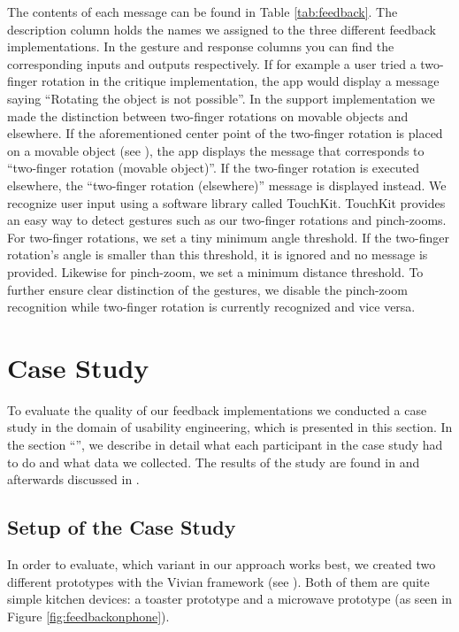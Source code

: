 \documentclass[11pt, a4paper]{article}
\begin{document}
		The contents of each message can be found in Table \ref{tab:feedback}. The description column holds the names we assigned to the three different feedback implementations. In the gesture and response columns you can find the corresponding inputs and outputs respectively. If for example a user tried a two-finger rotation in the critique implementation, the app would display a message saying ``Rotating the object is not possible''.
		In the support implementation we made the distinction between two-finger rotations on movable objects and elsewhere. If the aforementioned center point of the two-finger rotation is placed on a movable object (see ), the app displays the message that corresponds to ``two-finger rotation (movable object)''. If the two-finger rotation is executed elsewhere, the ``two-finger rotation (elsewhere)'' message is displayed instead.
		We recognize user input using a software library called TouchKit. TouchKit provides an easy way to detect gestures such as our two-finger rotations and pinch-zooms. For two-finger rotations, we set a tiny minimum angle threshold. If the two-finger rotation's angle is smaller than this threshold, it is ignored and no message is provided. Likewise for pinch-zoom, we set a minimum distance threshold.
		To further ensure clear distinction of the gestures, we disable the pinch-zoom recognition while two-finger rotation is currently recognized and vice versa.


	\section*{Case Study}\label{sec:casestudy}
		
		To evaluate the quality of our feedback implementations we conducted a case study in the domain of usability engineering, which is presented in this section. In the section ``'', we describe in detail what each participant in the case study had to do and what data we collected. The results of the study are found in  and afterwards discussed in .
		
		\subsection*{Setup of the Case Study}\label{ssec:setup}
			In order to evaluate, which variant in our approach works best, we created two different prototypes with the Vivian framework (see ). Both of them are quite simple kitchen devices: a toaster prototype and a microwave prototype (as seen in Figure \ref{fig:feedbackonphone}).
\end{document}
